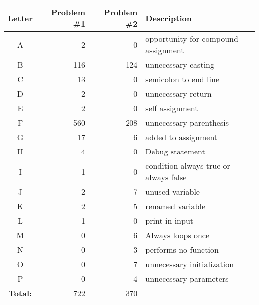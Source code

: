 \vspace{2em}
\small
\begin{supertabular}{crrp{.5\textwidth}}
\label{labelsD}
Letter & Problem \#1 & Problem \#2 & Description \\ 
\toprule
A & 2 & 0 & opportunity for compound assignment \\
B & 116 & 124 & unnecessary casting \\
C & 13 & 0 & semicolon to end line \\
D & 2 & 0 & unnecessary return \\
E & 2 & 0 & self assignment \\
F & 560 & 208 & unnecessary parenthesis \\
G & 17 & 6 & added to assignment \\
H & 4 & 0 & Debug statement \\
I & 1 & 0 & condition always true or always false \\
J & 2 & 7 & unused variable \\
K & 2 & 5 & renamed variable \\
L & 1 & 0 & print in input \\
M & 0 & 6 & Always loops once \\
N & 0 & 3 & performs no function \\
O & 0 & 7 & unnecessary initialization \\
P & 0 & 4 & unnecessary parameters \\

\bottomrule
\textbf{Total:} & 722 & 370 & \\
\end{supertabular}
\vspace{2em}
